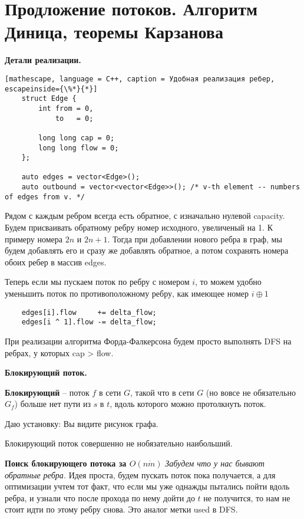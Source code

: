\section{Продложение потоков. Алгоритм Диница, теоремы Карзанова}%
\label{sec:Продложение потоков. Алгоритм Диница, теоремы Карзанова}

\textbf{Детали реализации.}

\begin{lstlisting}[mathescape, language = C++, caption = Удобная реализация ребер, escapeinside={\%*}{*}] 
	struct Edge {
		int from = 0,
		    to   = 0;

		long long cap = 0;
		long long flow = 0;
	};

	auto edges = vector<Edge>();
	auto outbound = vector<vector<Edge>>(); /* v-th element -- numbers of edges from v. */
\end{lstlisting}

Рядом с каждым ребром всегда есть обратное, с изначально нулевой capacity. Будем присваивать обратному ребру номер исходного, увеличеный на 1. К примеру номера $2n$ и $2n + 1$.
Тогда при добавлении нового ребра в граф, мы будем добавлять его и сразу же добавлять обратное, а потом сохранять номера обоих ребер в массив edges.

Теперь если мы пускаем поток по ребру с номером $i$, то можем удобно уменьшить поток по противоположному ребру, как имеющее номер $i \oplus 1$

\begin{lstlisting}
	edges[i].flow     += delta_flow;
	edges[i ^ 1].flow -= delta_flow;
\end{lstlisting}
При реализации алгоритма Форда-Фалкерсона будем просто выполнять DFS на ребрах, у которых cap > flow.

\textbf{Блокирующий поток.}
\begin{def}
	\textbf{Блокирующий} --  поток $f$ в сети  $G$, такой что в сети  $G$ (но вовсе не обязательно $G_f$) больше нет пути из $s$ в  $t$, вдоль которого можно протолкнуть поток. 
\end{def}

\begin{example}
	Даю установку: Вы видите рисунок графа.
\end{example}

\begin{note}
	Блокирующий поток совершенно не нобязательно наибольший.	
\end{note}

\textbf{Поиск блокирующего потока за $O(n \dot m)$}
\textit{Забудем что у нас бывают обратные ребра.}
Идея проста, будем пускать поток пока получается, а для оптимизации учтем тот факт, что если мы уже однажды пытались пойти вдоль ребра, и узнали что после прохода по нему дойти до $t$ не получится, то нам не стоит идти по этому ребру снова. Это аналог метки used в DFS.

